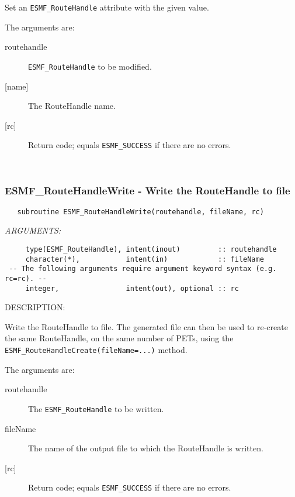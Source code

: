      Set an {\tt ESMF\_RouteHandle} attribute with the given value.
  
     The arguments are:
     \begin{description}
     \item[routehandle] 
       {\tt ESMF\_RouteHandle} to be modified.
     \item [{[name]}]
       The RouteHandle name.
     \item[{[rc]}] 
       Return code; equals {\tt ESMF\_SUCCESS} if there are no errors.
     \end{description}
   
 
\mbox{}\hrulefill\ 
 
\subsubsection [ESMF\_RouteHandleWrite] {ESMF\_RouteHandleWrite - Write the RouteHandle to file}


 
\begin{verbatim}   subroutine ESMF_RouteHandleWrite(routehandle, fileName, rc)\end{verbatim}{\em ARGUMENTS:}
\begin{verbatim}     type(ESMF_RouteHandle), intent(inout)         :: routehandle   
     character(*),           intent(in)            :: fileName
 -- The following arguments require argument keyword syntax (e.g. rc=rc). --
     integer,                intent(out), optional :: rc\end{verbatim}
{\sf DESCRIPTION:\\ }


     Write the RouteHandle to file. The generated file can then be used to
     re-create the same RouteHandle, on the same number of PETs, using the 
     {\tt ESMF\_RouteHandleCreate(fileName=...)} method.
  
     The arguments are:
     \begin{description}
     \item[routehandle] 
       The {\tt ESMF\_RouteHandle} to be written.
     \item[fileName]
       The name of the output file to which the RouteHandle is written.
     \item[{[rc]}] 
       Return code; equals {\tt ESMF\_SUCCESS} if there are no errors.
     \end{description}
  
\setlength{\parskip}{\oldparskip}
\setlength{\parindent}{\oldparindent}
\setlength{\baselineskip}{\oldbaselineskip}
